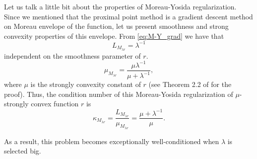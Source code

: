 Let us talk a little bit about the properties of Moreau-Yosida regularization. Since we mentioned that the proximal point method is a gradient descent method on Moreau envelope of the function, let us present smoothness and strong convexity properties of this envelope. From \eqref{eq:M-Y_grad} we have that 
\begin{equation}\label{eq:M-Y_smoothness}
L_{M_{\lambda r}} = \lambda^{-1}
\end{equation}
independent on the smoothness parameter of $r$.
\begin{equation}\label{eq:M-Y_strongly}
\mu_{M_{\lambda r}} = \frac{\mu\lambda^{-1}}{\mu + \lambda^{-1}},
\end{equation}
where $\mu$ is the strongly convexity constant of $r$ (see Theorem 2.2 of \cite{lemarechal1997practical} for the proof). Thus, the condition number of this Moreau-Yosida regularization of $\mu$-strongly convex function $r$ is 
\begin{equation}\label{eq:M-Y_condition}
\kappa_{M_{\lambda r}} = \frac{L_{M_{\lambda r}}}{\mu_{M_{\lambda r}}} = \frac{\mu + \lambda^{-1}}{\mu}.
\end{equation}

As a result, this problem becomes exceptionally well-conditioned when $\lambda$ is selected big.






